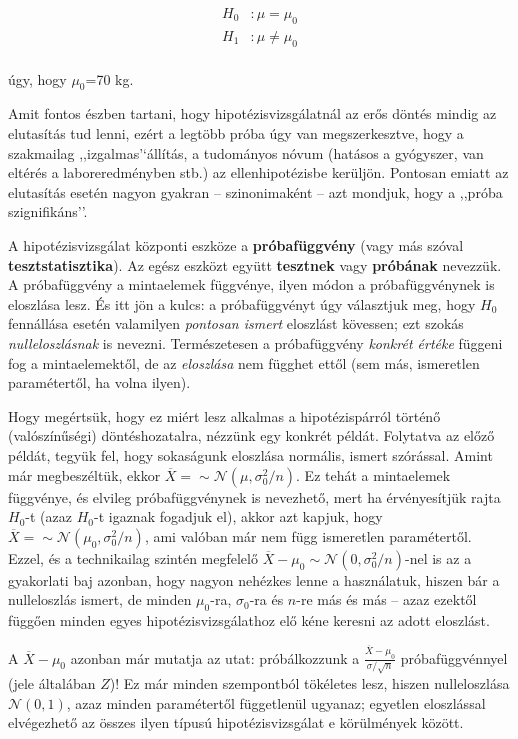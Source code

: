 \documentclass[]{book}
\begin{document}
\begin{align*}
    H_0&: \mu = \mu_0\\
    H_1&: \mu \neq \mu_0\\
\end{align*}

úgy, hogy \(\mu_0\)=70 kg.

Amit fontos észben tartani, hogy hipotézisvizsgálatnál az erős döntés
mindig az elutasítás tud lenni, ezért a legtöbb próba úgy van
megszerkesztve, hogy a szakmailag ,,izgalmas'`állítás, a tudományos
nóvum (hatásos a gyógyszer, van eltérés a laboreredményben stb.) az
ellenhipotézisbe kerüljön. Pontosan emiatt az elutasítás esetén nagyon
gyakran -- szinonimaként -- azt mondjuk, hogy a ,,próba szignifikáns''.

A hipotézisvizsgálat központi eszköze a \textbf{próbafüggvény} (vagy más
szóval \textbf{tesztstatisztika}). Az egész eszközt együtt
\textbf{tesztnek} vagy \textbf{próbának} nevezzük. A próbafüggvény a
mintaelemek függvénye, ilyen módon a próbafüggvénynek is eloszlása lesz.
És itt jön a kulcs: a próbafüggvényt úgy választjuk meg, hogy \(H_0\)
fennállása esetén valamilyen \emph{pontosan ismert} eloszlást kövessen;
ezt szokás \emph{nulleloszlásnak} is nevezni. Természetesen a
próbafüggvény \emph{konkrét értéke} függeni fog a mintaelemektől, de az
\emph{eloszlása} nem függhet ettől (sem más, ismeretlen paramétertől, ha
volna ilyen).

Hogy megértsük, hogy ez miért lesz alkalmas a hipotézispárról történő
(valószínűségi) döntéshozatalra, nézzünk egy konkrét példát. Folytatva
az előző példát, tegyük fel, hogy sokaságunk eloszlása normális, ismert
szórással. Amint már megbeszéltük, ekkor
\(\overline{X}= \sim \mathcal{N}\left(\mu,\sigma_0^2/n\right)\). Ez
tehát a mintaelemek függvénye, és elvileg próbafüggvénynek is nevezhető,
mert ha érvényesítjük rajta \(H_0\)-t (azaz \(H_0\)-t igaznak fogadjuk
el), akkor azt kapjuk, hogy
\(\overline{X}= \sim \mathcal{N}\left(\mu_0,\sigma_0^2/n\right)\), ami
valóban már nem függ ismeretlen paramétertől. Ezzel, és a technikailag
szintén megfelelő
\(\overline{X}-\mu_0\sim \mathcal{N}\left(0,\sigma_0^2/n\right)\)-nel is
az a gyakorlati baj azonban, hogy nagyon nehézkes lenne a használatuk,
hiszen bár a nulleloszlás ismert, de minden \(\mu_0\)-ra,
\(\sigma_0\)-ra és \(n\)-re más és más -- azaz ezektől függően minden
egyes hipotézisvizsgálathoz elő kéne keresni az adott eloszlást.

A \(\overline{X}-\mu_0\) azonban már mutatja az utat: próbálkozzunk a
\(\frac{\overline{X}-\mu_0}{\sigma/\sqrt{n}}\) próbafüggvénnyel (jele
általában \(Z\))! Ez már minden szempontból tökéletes lesz, hiszen
nulleloszlása \(\mathcal{N}\left(0,1\right)\), azaz minden paramétertől
függetlenül ugyanaz; egyetlen eloszlással elvégezhető az összes ilyen
típusú hipotézisvizsgálat e körülmények között.
\end{document}
